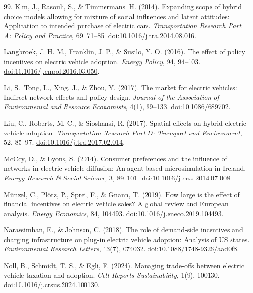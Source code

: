 \documentclass[11pt]{article} %
\begin{document}
\begin{thebibliography}{99.}
Kim, J., Rasouli, S., \& Timmermans, H. (2014).
Expanding scope of hybrid choice models allowing for mixture of social
influences and latent attitudes: Application to intended purchase of electric
cars.
\emph{Transportation Research Part A: Policy and Practice}, 69, 71--85.
\href{https://doi.org/10.1016/j.tra.2014.08.016}{doi:10.1016/j.tra.2014.08.016}.

Langbroek, J. H. M., Franklin, J. P., \& Susilo, Y. O. (2016).
The effect of policy incentives on electric vehicle adoption.
\emph{Energy Policy}, 94, 94--103.
\href{https://doi.org/10.1016/j.enpol.2016.03.050}{doi:10.1016/j.enpol.2016.03.050}.

Li, S., Tong, L., Xing, J., \& Zhou, Y. (2017).
The market for electric vehicles: Indirect network effects and policy design.
\emph{Journal of the Association of Environmental and Resource Economists},
4(1), 89--133.
\href{https://doi.org/10.1086/689702}{doi:10.1086/689702}.

Liu, C., Roberts, M. C., \& Sioshansi, R. (2017).
Spatial effects on hybrid electric vehicle adoption.
\emph{Transportation Research Part D: Transport and Environment}, 52, 85--97.
\href{https://doi.org/10.1016/j.trd.2017.02.014}{doi:10.1016/j.trd.2017.02.014}.

McCoy, D., \& Lyons, S. (2014).
Consumer preferences and the influence of networks in electric vehicle
diffusion: An agent-based microsimulation in Ireland.
\emph{Energy Research \& Social Science}, 3, 89--101.
\href{https://doi.org/10.1016/j.erss.2014.07.008}{doi:10.1016/j.erss.2014.07.008}.

M\"{u}nzel, C., Pl\"{o}tz, P., Sprei, F., \& Gnann, T. (2019).
How large is the effect of financial incentives on electric vehicle sales? A
global review and European analysis.
\emph{Energy Economics}, 84, 104493.
\href{https://doi.org/10.1016/j.eneco.2019.104493}{doi:10.1016/j.eneco.2019.104493}.

Narassimhan, E., \& Johnson, C. (2018).
The role of demand-side incentives and charging infrastructure on plug-in
electric vehicle adoption: Analysis of US states.
\emph{Environmental Research Letters}, 13(7), 074032.
\href{https://doi.org/10.1088/1748-9326/aad0f8}{doi:10.1088/1748-9326/aad0f8}.

Noll, B., Schmidt, T. S., \& Egli, F. (2024).
Managing trade-offs between electric vehicle taxation and adoption.
\emph{Cell Reports Sustainability}, 1(9), 100130.
\href{https://doi.org/10.1016/j.crsus.2024.100130}{doi:10.1016/j.crsus.2024.100130}.


\end{thebibliography}
\end{document}
